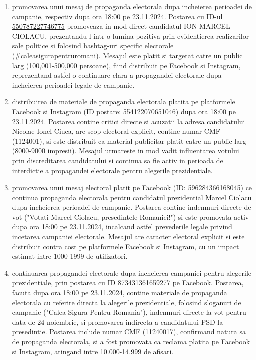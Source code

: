 \documentclass[a4paper,12pt]{article}
\begin{document}
\begin{enumerate}[leftmargin=*, label=\arabic*.)]
    \item promovarea unui mesaj de propaganda electorala dupa incheierea perioadei de campanie, respectiv dupa ora 18:00 pe 23.11.2024. Postarea cu ID-ul \href{https://www.facebook.com/ads/library/?id=550787227746775}{550787227746775} promoveaza in mod direct candidatul ION-MARCEL CIOLACU, prezentandu-l intr-o lumina pozitiva prin evidentierea realizarilor sale politice si folosind hashtag-uri specific electorale (\#caleasigurapentruromani). Mesajul este platit si targetat catre un public larg (100,001-500,000 persoane), fiind distribuit pe Facebook si Instagram, reprezentand astfel o continuare clara a propagandei electorale dupa incheierea perioadei legale de campanie.
    \item distribuirea de materiale de propaganda electorala platita pe platformele Facebook si Instagram (ID postare: \href{https://www.facebook.com/ads/library/?id=554122070651046}{554122070651046}) dupa ora 18:00 pe 23.11.2024. Postarea contine critici directe si acuzatii la adresa candidatului Nicolae-Ionel Ciuca, are scop electoral explicit, contine numar CMF (1124001), si este distribuit ca material publicitar platit catre un public larg (8000-9000 impresii). Mesajul urmareste in mod vadit influentarea votului prin discreditarea candidatului si continua sa fie activ in perioada de interdictie a propagandei electorale pentru alegerile prezidentiale.
    \item promovarea unui mesaj electoral platit pe Facebook (ID: \href{https://www.facebook.com/ads/library/?id=596284366168045}{596284366168045}) ce continua propaganda electorala pentru candidatul prezidential Marcel Ciolacu dupa incheierea perioadei de campanie. Postarea contine indemnuri directe de vot ("Votati Marcel Ciolacu, presedintele Romaniei!") si este promovata activ dupa ora 18:00 pe 23.11.2024, incalcand astfel prevederile legale privind incetarea campaniei electorale. Mesajul are caracter electoral explicit si este distribuit contra cost pe platformele Facebook si Instagram, cu un impact estimat intre 1000-1999 de utilizatori.
    \item continuarea propagandei electorale dupa incheierea campaniei pentru alegerile prezidentiale, prin postarea cu ID \href{https://www.facebook.com/ads/library/?id=873431361659277}{873431361659277} pe Facebook. Postarea, facuta dupa ora 18:00 pe 23.11.2024, contine materiale de propaganda electorala cu referire directa la alegerile prezidentiale, folosind sloganuri de campanie ("Calea Sigura Pentru Romania"), indemnuri directe la vot pentru data de 24 noiembrie, si promovarea indirecta a candidatului PSD la presedintie. Postarea include numar CMF (11240017), confirmand natura sa de propaganda electorala, si a fost promovata ca reclama platita pe Facebook si Instagram, atingand intre 10.000-14.999 de afisari.

\end{enumerate}
\end{document}
